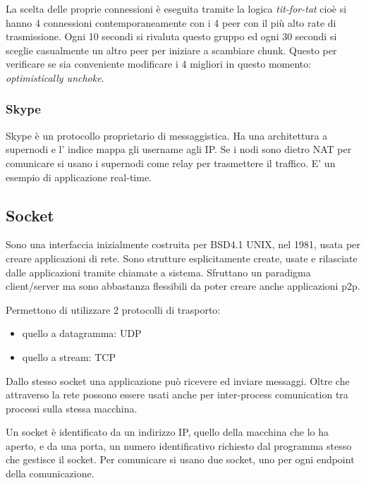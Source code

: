 La scelta delle proprie connessioni è eseguita tramite la logica \emph{tit-for-tat} cioè si hanno 4 connessioni contemporaneamente con i 4 peer con il più alto rate di trasmissione.
Ogni 10 secondi si rivaluta questo gruppo ed ogni 30 secondi si sceglie casualmente un altro peer per iniziare a scambiare chunk. Questo per verificare se sia conveniente modificare i 4 migliori in questo momento: \emph{optimistically unchoke}.

\subsubsection{Skype}
Skype è un protocollo proprietario di messaggistica.
Ha una architettura a supernodi e l' indice mappa gli username agli IP.
Se i nodi sono dietro NAT per comunicare si usano i supernodi come relay per trasmettere il traffico.
E' un esempio di applicazione real-time.

\subsection{Socket}
Sono una interfaccia inizialmente costruita per BSD4.1 UNIX, nel 1981, usata per creare applicazioni di rete.
Sono strutture esplicitamente create, usate e rilasciate dalle applicazioni tramite chiamate a sistema.
Sfruttano un paradigma client/server ma sono abbastanza flessibili da poter creare anche applicazioni p2p.

Permettono di utilizzare 2 protocolli di trasporto:
\begin{itemize}
    \item quello a datagramma: UDP
    \item quello a stream: TCP
\end{itemize}
Dallo stesso socket una applicazione può ricevere ed inviare messaggi.
Oltre che attraverso la rete possono essere usati anche per inter-process comunication tra processi sulla stessa macchina.

Un socket è identificato da un indirizzo IP, quello della macchina che lo ha aperto, e da una porta, un numero identificativo richiesto dal programma stesso che gestisce il socket.
Per comunicare si usano due socket, uno per ogni endpoint della comunicazione.
